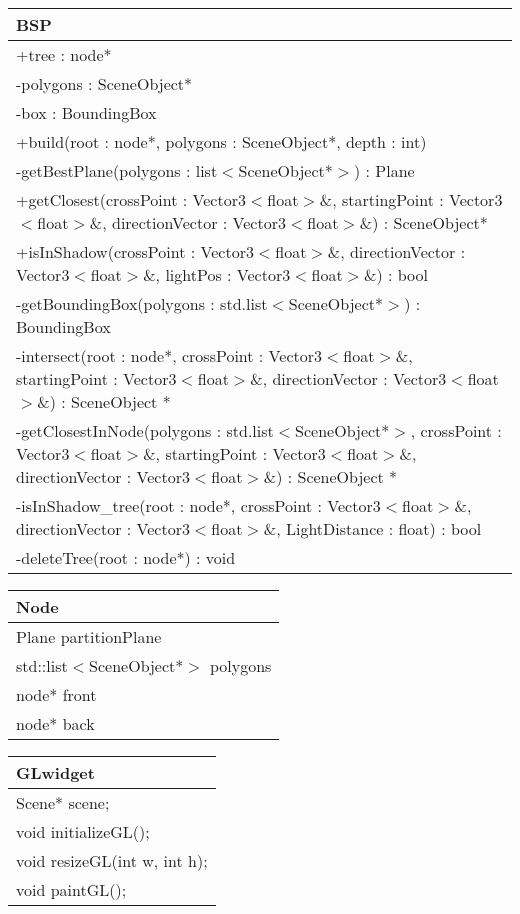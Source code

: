 \begin{center}
    \begin{tabular}{|l|}
    \hline
    BSP \\ \hline
    +tree : node* \\
    -polygons : SceneObject* \\
    -box : BoundingBox \\ 
	\hline
	+build(root : node*, polygons : SceneObject*, depth : int) \\ 
	-getBestPlane(polygons : list$<$SceneObject*$>$) : Plane \\
	+getClosest(crossPoint : Vector3$<$float$>$\&, startingPoint : Vector3$<$float$>$\&, directionVector : Vector3$<$float$>$\&) : SceneObject* \\
	+isInShadow(crossPoint : Vector3$<$float$>$\&, directionVector : Vector3$<$float$>$\&, lightPos : Vector3$<$float$>$\&) : bool \\
	-getBoundingBox(polygons : std.list$<$SceneObject*$>$) : BoundingBox \\
	-intersect(root : node*, crossPoint : Vector3$<$float$>$\&, startingPoint : Vector3$<$float$>$\&, directionVector : Vector3$<$float$>$\&) : SceneObject * \\
	-getClosestInNode(polygons : std.list$<$SceneObject*$>$, crossPoint : Vector3$<$float$>$\&, startingPoint : Vector3$<$float$>$\&, directionVector : Vector3$<$float$>$\&) : SceneObject * \\
	-isInShadow\_tree(root : node*, crossPoint : Vector3$<$float$>$\&, directionVector : Vector3$<$float$>$\&, LightDistance : float) : bool \\
	-deleteTree(root : node*) : void \\
	\hline
    \end{tabular}
\end{center}

\begin{center}
    \begin{tabular}{|l|}
    \hline
    Node \\ \hline
    Plane partitionPlane \\
    std::list$<$SceneObject*$>$ polygons \\
    node* front \\
    node* back \\ \hline
    \end{tabular}
\end{center}


\begin{center}
    \begin{tabular}{|l|}
    \hline
    GLwidget \\ \hline
    Scene* scene; \\ \hline
    void initializeGL(); \\ 
    void resizeGL(int w, int h); \\
    void paintGL(); \\ \hline
    \end{tabular}
\end{center}


